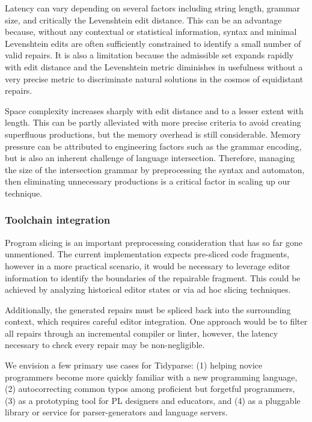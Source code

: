 \documentclass[sigplan,review,acmsmall,nonacm,screen,anonymous]{acmart}\settopmatter{printfolios=false,printccs=false,printacmref=false}
\begin{document}
Latency can vary depending on several factors including string length, grammar size, and critically the Levenshtein edit distance. This can be an advantage because, without any contextual or statistical information, syntax and minimal Levenshtein edits are often sufficiently constrained to identify a small number of valid repairs. It is also a limitation because the admissible set expands rapidly with edit distance and the Levenshtein metric diminishes in usefulness without a very precise metric to discriminate natural solutions in the cosmos of equidistant repairs.

Space complexity increases sharply with edit distance and to a lesser extent with length. This can be partly alleviated with more precise criteria to avoid creating superfluous productions, but the memory overhead is still considerable. Memory pressure can be attributed to engineering factors such as the grammar encoding, but is also an inherent challenge of language intersection. Therefore, managing the size of the intersection grammar by preprocessing the syntax and automaton, then eliminating unnecessary productions is a critical factor in scaling up our technique.

\subsubsection{Toolchain integration}

Program slicing is an important preprocessing consideration that has so far gone unmentioned. The current implementation expects pre-sliced code fragments, however in a more practical scenario, it would be necessary to leverage editor information to identify the boundaries of the repairable fragment. This could be achieved by analyzing historical editor states or via ad hoc slicing techniques.

Additionally, the generated repairs must be spliced back into the surrounding context, which requires careful editor integration. One approach would be to filter all repairs through an incremental compiler or linter, however, the latency necessary to check every repair may be non-negligible.

We envision a few primary use cases for Tidyparse: (1) helping novice programmers become more quickly familiar with a new programming language, (2) autocorrecting common typos among proficient but forgetful programmers, (3) as a prototyping tool for PL designers and educators, and (4) as a pluggable library or service for parser-generators and language servers.
\end{document}
